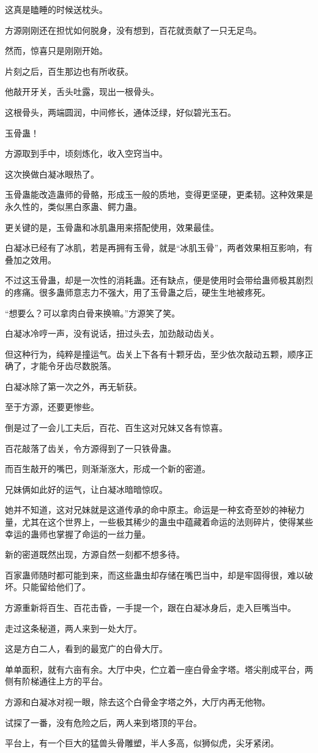 \begin{this_body}
这真是瞌睡的时候送枕头。

方源刚刚还在担忧如何脱身，没有想到，百花就贡献了一只无足鸟。

然而，惊喜只是刚刚开始。

片刻之后，百生那边也有所收获。

他敲开牙关，舌头吐露，现出一根骨头。

这根骨头，两端圆润，中间修长，通体泛绿，好似碧光玉石。

玉骨蛊！

方源取到手中，顷刻炼化，收入空窍当中。

这次换做白凝冰眼热了。

玉骨蛊能改造蛊师的骨骼，形成玉一般的质地，变得更坚硬，更柔韧。这种效果是永久性的，类似黑白豕蛊、鳄力蛊。

更关键的是，玉骨蛊和冰肌蛊用来搭配使用，效果最佳。

白凝冰已经有了冰肌，若是再拥有玉骨，就是“冰肌玉骨”，两者效果相互影响，有叠加之效用。

不过这玉骨蛊，却是一次性的消耗蛊。还有缺点，便是使用时会带给蛊师极其剧烈的疼痛。很多蛊师意志力不强大，用了玉骨蛊之后，硬生生地被疼死。

“想要么？可以拿肉白骨来换嘛。”方源笑了笑。

白凝冰冷哼一声，没有说话，扭过头去，加劲敲动齿关。

但这种行为，纯粹是撞运气。齿关上下各有十颗牙齿，至少依次敲动五颗，顺序正确了，才能令牙齿尽数脱落。

白凝冰除了第一次之外，再无斩获。

至于方源，还要更惨些。

倒是过了一会儿工夫后，百花、百生这对兄妹又各有惊喜。

百花敲落了齿关，令方源得到了一只铁骨蛊。

而百生敲开的嘴巴，则渐渐涨大，形成一个新的密道。

兄妹俩如此好的运气，让白凝冰暗暗惊叹。

她并不知道，这对兄妹就是这道传承的命中原主。命运是一种玄奇至妙的神秘力量，尤其在这个世界上，一些极其稀少的蛊虫中蕴藏着命运的法则碎片，使得某些幸运的蛊师也掌握了命运的一丝力量。

新的密道既然出现，方源自然一刻都不想多待。

百家蛊师随时都可能到来，而这些蛊虫却存储在嘴巴当中，却是牢固得很，难以破坏。只能留给他们了。

方源重新将百生、百花击昏，一手提一个，跟在白凝冰身后，走入巨嘴当中。

走过这条秘道，两人来到一处大厅。

这是方白二人，看到的最宽广的白骨大厅。

单单面积，就有六亩有余。大厅中央，伫立着一座白骨金字塔。塔尖削成平台，两侧有阶梯通往上方的平台。

方源和白凝冰对视一眼，除去这个白骨金字塔之外，大厅内再无他物。

试探了一番，没有危险之后，两人来到塔顶的平台。

平台上，有一个巨大的猛兽头骨雕塑，半人多高，似狮似虎，尖牙紧闭。

\end{this_body}

